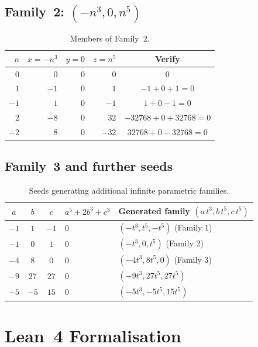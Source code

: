 \documentclass[12pt,a4paper]{article}
\theoremstyle{definition}
\begin{document}
\subsection{Family~2: $(-n^3, 0, n^5)$}

\begin{table}[h]
\centering
\caption{Members of Family~2.}
\label{tab:family2}
\renewcommand{\arraystretch}{1.2}
\begin{tabular}{rrrrc}
\toprule
$n$ & $x = -n^3$ & $y = 0$ & $z = n^5$ & Verify \\
\midrule
$0$  & $0$    & $0$ & $0$    & $0$ \\
$1$  & $-1$   & $0$ & $1$    & $-1+0+1=0$ \\
$-1$ & $1$    & $0$ & $-1$   & $1+0-1=0$ \\
$2$  & $-8$   & $0$ & $32$   & $-32768+0+32768=0$ \\
$-2$ & $8$    & $0$ & $-32$  & $32768+0-32768=0$ \\
\bottomrule
\end{tabular}
\end{table}

\subsection{Family~3 and further seeds}

\begin{table}[h]
\centering
\caption{Seeds generating additional infinite parametric families.}
\label{tab:seeds}
\renewcommand{\arraystretch}{1.2}
\begin{tabular}{cccll}
\toprule
$a$ & $b$ & $c$ & $a^5 + 2b^3 + c^3$ & Generated family $(a\,t^3, b\,t^5, c\,t^5)$ \\
\midrule
$-1$  & $1$   & $-1$  & $0$ & $(-t^3, t^5, -t^5)$ (Family 1) \\
$-1$  & $0$   & $1$   & $0$ & $(-t^3, 0, t^5)$ (Family 2) \\
$-4$  & $8$   & $0$   & $0$ & $(-4t^3, 8t^5, 0)$ (Family 3) \\
$-9$  & $27$  & $27$  & $0$ & $(-9t^3, 27t^5, 27t^5)$ \\
$-5$  & $-5$  & $15$  & $0$ & $(-5t^3, -5t^5, 15t^5)$ \\
\bottomrule
\end{tabular}
\end{table}

\section{Lean~4 Formalisation}\label{sec:lean}
\end{document}
